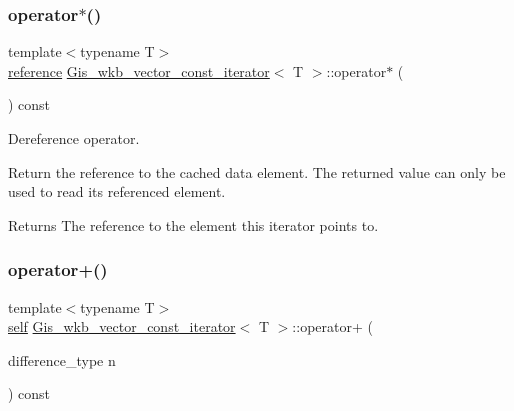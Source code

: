 \subsubsection{\texorpdfstring{operator$\ast$()}{operator*()}}
{\footnotesize\ttfamily template$<$typename T$>$ \\
\mbox{\hyperlink{classGis__wkb__vector__const__iterator_a320ffe7a48e9c6440eb76d321ff8c5a2}{reference}} \mbox{\hyperlink{classGis__wkb__vector__const__iterator}{Gis\+\_\+wkb\+\_\+vector\+\_\+const\+\_\+iterator}}$<$ T $>$\+::operator$\ast$ (\begin{DoxyParamCaption}{ }\end{DoxyParamCaption}) const\hspace{0.3cm}{\ttfamily [inline]}}



Dereference operator. 

Return the reference to the cached data element. The returned value can only be used to read its referenced element. \begin{DoxyReturn}{Returns}
The reference to the element this iterator points to. 
\end{DoxyReturn}
\mbox{\label{classGis__wkb__vector__const__iterator_a56ceef1b31e06b9dd58207de7bd0f20d}} 
\subsubsection{\texorpdfstring{operator+()}{operator+()}}
{\footnotesize\ttfamily template$<$typename T$>$ \\
\mbox{\hyperlink{classGis__wkb__vector__const__iterator}{self}} \mbox{\hyperlink{classGis__wkb__vector__const__iterator}{Gis\+\_\+wkb\+\_\+vector\+\_\+const\+\_\+iterator}}$<$ T $>$\+::operator+ (\begin{DoxyParamCaption}\item[{difference\+\_\+type}]{n }\end{DoxyParamCaption}) const\hspace{0.3cm}{\ttfamily [inline]}}

